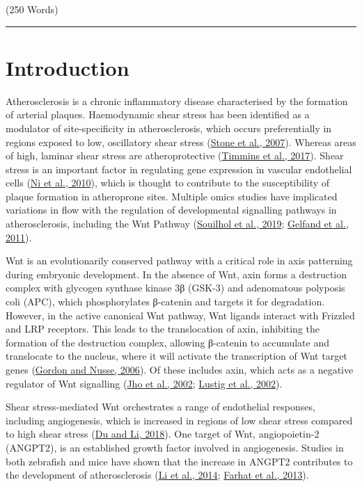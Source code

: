\documentclass[
  11pt,
]{article}
\begin{document}
\begin{flushright}
(250 Words)\\
\end{flushright}
\rule{\textwidth}{0.4pt}

\hypertarget{introduction}{%
\section{Introduction}\label{introduction}}

Atherosclerosis is a chronic inflammatory disease characterised by the formation of arterial plaques.
Haemodynamic shear stress has been identified as a modulator of site-specificity in atherosclerosis, which occurs preferentially in regions exposed to low, oscillatory shear stress (\protect\hyperlink{ref-stone2007}{Stone et al., 2007}).
Whereas areas of high, laminar shear stress are atheroprotective (\protect\hyperlink{ref-timmins2017}{Timmins et al., 2017}).
Shear stress is an important factor in regulating gene expression in vascular endothelial cells (\protect\hyperlink{ref-Ni2010}{Ni et al., 2010}), which is thought to contribute to the susceptibility of plaque formation in atheroprone sites.
Multiple omics studies have implicated variations in flow with the regulation of developmental signalling pathways in atherosclerosis, including the Wnt Pathway (\protect\hyperlink{ref-Souilhol2020}{Souilhol et al., 2019}; \protect\hyperlink{ref-Gelfand2011}{Gelfand et al., 2011}).

Wnt is an evolutionarily conserved pathway with a critical role in axis patterning during embryonic development.
In the absence of Wnt, axin forms a destruction complex with glycogen synthase kinase 3β (GSK-3) and adenomatous polyposis coli (APC), which phosphorylates β-catenin and targets it for degradation.
However, in the active canonical Wnt pathway, Wnt ligands interact with Frizzled and LRP receptors.
This leads to the translocation of axin, inhibiting the formation of the destruction complex, allowing β-catenin to accumulate and translocate to the nucleus, where it will activate the transcription of Wnt target genes (\protect\hyperlink{ref-gordon2006}{Gordon and Nusse, 2006}).
Of these includes axin, which acts as a negative regulator of Wnt signalling (\protect\hyperlink{ref-Jho2002}{Jho et al., 2002}; \protect\hyperlink{ref-Lustig2002}{Lustig et al., 2002}).

Shear stress-mediated Wnt orchestrates a range of endothelial responses, including angiogenesis, which is increased in regions of low shear stress compared to high shear stress (\protect\hyperlink{ref-du2018}{Du and Li, 2018}).
One target of Wnt, angiopoietin-2 (ANGPT2), is an established growth factor involved in angiogenesis.
Studies in both zebrafish and mice have shown that the increase in ANGPT2 contributes to the development of atherosclerosis (\protect\hyperlink{ref-Li2014-mx}{Li et al., 2014}; \protect\hyperlink{ref-farhat2013}{Farhat et al., 2013}).
\end{document}
